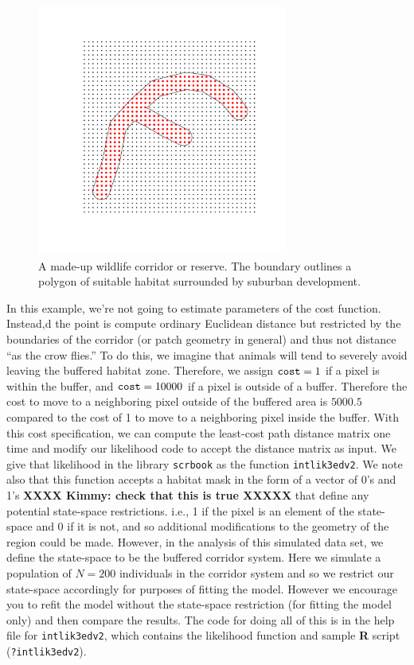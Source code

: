 \begin{figure}[h]
\begin{center}
\includegraphics[height=3.25in,width=3.25in]{Ch12-EcolDist/figs/corridor}
\end{center}
\caption{A made-up wildlife corridor or reserve. The boundary outlines
  a polygon of suitable habitat surrounded by suburban development.}
\label{ecoldist.fig.corridor}
\end{figure}

In this example, we're not going to estimate parameters of the cost
function. Instead,d the point is compute ordinary Euclidean distance
but restricted by the boundaries of the corridor (or patch geometry in
general) and thus not distance ``as the crow flies.''  To do this, we
imagine that animals will tend to severely avoid leaving the buffered
habitat zone. Therefore, we assign $\mbox{\tt cost}=1$ if a pixel is
within the buffer, and $\mbox{\tt cost} = 10000$ if a pixel is outside
of a buffer. Therefore the cost to move to a neighboring pixel outside
of the buffered area is $5000.5$ compared to the cost of 1 to move to
a neighboring pixel inside the buffer.  With this cost specification,
we can compute the least-cost path distance matrix one time and modify
our likelihood code to accept the distance matrix as input. We give
that likelihood in the library \mbox{\tt scrbook} as the function
\mbox{\tt intlik3edv2}.  We note also that this function accepts a
habitat mask in the form of a vector of 0's
and 1's {\bf XXXX Kimmy: check that this is true XXXXX}
that define any potential state-space restrictions. i.e., 1 if
the pixel is an element of the state-space and 0 if it is not, and so
additional modifications to the geometry of the region could be made.
However, in the analysis of this simulated data set, we define the
state-space to be the buffered corridor system.  Here we simulate a
population of $N=200$ individuals in the corridor system and so we
restrict our state-space accordingly for purposes of fitting the
model. However we encourage you to refit the model without the
state-space restriction (for fitting the model only) and then compare
the results.  The code for doing all of this is in the help file for
\mbox{\tt intlik3edv2}, which contains the likelihood function and
sample {\bf R} script (\mbox{\tt ?intlik3edv2}).

